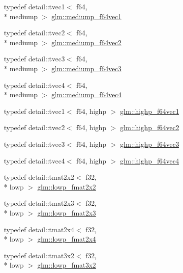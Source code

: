 \begin{DoxyCompactItemize}
\item 
typedef detail\-::tvec1$<$ f64, \\*
mediump $>$ \hyperlink{group__gtc__type__precision_ga1e3bbbd9ce5e215c4ba0980264b2711d}{glm\-::mediump\-\_\-f64vec1}
\item 
typedef detail\-::tvec2$<$ f64, \\*
mediump $>$ \hyperlink{group__gtc__type__precision_ga892891863b8e50195e3e48077a329335}{glm\-::mediump\-\_\-f64vec2}
\item 
typedef detail\-::tvec3$<$ f64, \\*
mediump $>$ \hyperlink{group__gtc__type__precision_gae2832f9acbf0cc1071fcf93336db6e0c}{glm\-::mediump\-\_\-f64vec3}
\item 
typedef detail\-::tvec4$<$ f64, \\*
mediump $>$ \hyperlink{group__gtc__type__precision_ga0e011facac062fd7fb9b40c7d8288310}{glm\-::mediump\-\_\-f64vec4}
\item 
typedef detail\-::tvec1$<$ f64, highp $>$ \hyperlink{group__gtc__type__precision_ga1054b4e4da2b907b35e1806bd6fbaef1}{glm\-::highp\-\_\-f64vec1}
\item 
typedef detail\-::tvec2$<$ f64, highp $>$ \hyperlink{group__gtc__type__precision_ga1efd4982eaeafae59ce40deb89e018e7}{glm\-::highp\-\_\-f64vec2}
\item 
typedef detail\-::tvec3$<$ f64, highp $>$ \hyperlink{group__gtc__type__precision_ga93cbac95bb9106fe15c987c0f56ae679}{glm\-::highp\-\_\-f64vec3}
\item 
typedef detail\-::tvec4$<$ f64, highp $>$ \hyperlink{group__gtc__type__precision_ga1e9d8145fb9521701a5eeb6df5754184}{glm\-::highp\-\_\-f64vec4}
\item 
typedef detail\-::tmat2x2$<$ f32, \\*
lowp $>$ \hyperlink{group__gtc__type__precision_ga99367a30c64035d7e7f76410105d10e3}{glm\-::lowp\-\_\-fmat2x2}
\item 
typedef detail\-::tmat2x3$<$ f32, \\*
lowp $>$ \hyperlink{group__gtc__type__precision_ga01c5c29a6cee22c3e75de25c98dbecc9}{glm\-::lowp\-\_\-fmat2x3}
\item 
typedef detail\-::tmat2x4$<$ f32, \\*
lowp $>$ \hyperlink{group__gtc__type__precision_ga14b4460b2132fd3db19b53ec6f9353f2}{glm\-::lowp\-\_\-fmat2x4}
\item 
typedef detail\-::tmat3x2$<$ f32, \\*
lowp $>$ \hyperlink{group__gtc__type__precision_ga6e03c9a11f7d781af7549ce566844cc6}{glm\-::lowp\-\_\-fmat3x2}

\end{DoxyCompactItemize}
